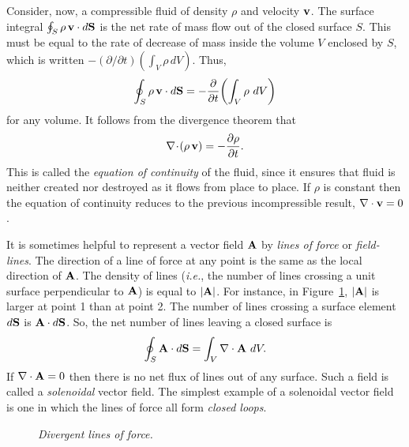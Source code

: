 Consider, now, a compressible fluid of density $\rho$ and velocity ${\bf v}$.
The surface integral $\oint_S\rho \,{\bf v} \cdot d{\bf S}$ is the net rate of
mass flow out of the closed surface $S$. This must be equal to the rate of
decrease of mass inside the volume $V$ enclosed by $S$, which is written
$-({\partial}/{\partial t})(\int_V \rho\,dV)$. Thus,
\begin{equation}
\oint_S \rho\,{\bf v}\cdot d{\bf S} = -\frac{\partial}{\partial t}\!\left(
\int_V \rho\, \,dV\right)
\end{equation}
for any volume. It follows from the divergence theorem that
\begin{equation}\label{econt}
\nabla\!\cdot\!(\rho\,{\bf v}) = -\frac{\partial \rho}{\partial t}.
\end{equation}
This is called the {\em equation of continuity} of the fluid, since it ensures that
fluid is neither created nor destroyed as it flows from place to place.
If $\rho$ is constant then the equation of continuity reduces to the 
previous incompressible
result, $\nabla\cdot{\bf v}=0$.


It is sometimes helpful to represent a vector field ${\bf A}$ by {\em lines of force}
or  {\em field-lines}.
The direction of a line of force at any point is the same as the local direction of
${\bf A}$. The density of lines ({\em i.e.}, the number of lines crossing a unit surface
perpendicular to ${\bf A}$) is equal to $|{\bf A}|$. 
 For instance, in Figure~\ref{f20}, $|{\bf A}|$ is larger at point 1 than at point 2. The number of lines
crossing a surface element $d{\bf S}$ is ${\bf A}\cdot d{\bf S}$. So, the
net number of lines leaving a closed surface is
\begin{equation}
\oint_S {\bf A}\cdot d{\bf S} = \int_V \nabla\cdot{\bf A}\,\,dV.
\end{equation}
If $\nabla\cdot{\bf A}=0$ then there is no net flux of lines out of any surface.
 Such a field is
called a {\em solenoidal}\/ vector field. The simplest example of a solenoidal vector
field is one in which the lines of force all form {\em closed loops}.
\begin{figure}
\epsfysize=1.5in
\centerline{}
\caption{\em Divergent lines of force.}\label{f20}
\end{figure}

